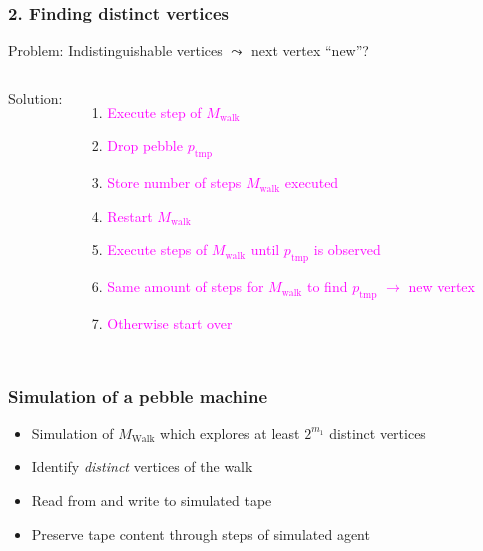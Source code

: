 \documentclass{beamer}
\begin{document}
\begin{frame}
  \frametitle{2. Finding distinct vertices}
  Problem: Indistinguishable vertices $\leadsto$ next vertex \enquote{new}?
  \begin{columns}
    Solution:
    \begin{enumerate}
      \item \textcolor<3,8>{magenta}{Execute step of $M_{\text{walk}}$}
      \item \textcolor<4,9>{magenta}{Drop pebble $p_{\text{tmp}}$}
      \item \textcolor<4,9>{magenta}{Store number of steps $M_{\text{walk}}$
        executed}
      \item \textcolor<5,10>{magenta}{Restart $M_{\text{walk}}$}
      \item \textcolor<6,11-18>{magenta}{Execute steps of $M_{\text{walk}}$
          until $p_{\text{tmp}}$ is observed}
      \item \textcolor<19-20>{magenta}{Same amount of steps for
        $M_{\text{walk}}$ to find $p_{\text{tmp}}$ $\rightarrow$ new vertex}
      \item \textcolor<7>{magenta}{Otherwise start over}
    \end{enumerate}
    
  \end{columns}
\end{frame}



\begin{frame}
  \frametitle{Simulation of a pebble machine}
  \begin{itemize}
    \item Simulation of $M_{\text{Walk}}$ which explores at least $2^{m_{1}}$
      distinct vertices 
    \item Identify \emph{distinct} vertices of the walk
    \item Read from and write to simulated tape 
    \item Preserve tape content through steps of simulated agent
  \end{itemize}
\end{frame}
\end{document}
